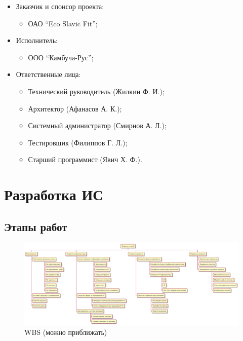 \documentclass[a4paper,8pt]{article}
\begin{document}
    \begin{itemize}
        \item Заказчик и спонсор проекта:
            \begin{itemize}
                \item ОАО “Eco Slavic Fit”;
            \end{itemize}
        \item Исполнитель:
            \begin{itemize}
                \item ООО “Камбуча-Рус”; 
            \end{itemize}
        \item Ответственные лица:
            \begin{itemize}
                \item Технический руководитель (Жилкин Ф. И.);
                \item Архитектор (Афанасов А. К.);
                \item Системный администратор (Смирнов А. Л.);
                \item Тестировщик (Филиппов Г. Л.);
                \item Старший программист (Явич Х. Ф.).
            \end{itemize}
    \end{itemize}

\section{Разработка ИС}



\subsection{Этапы работ}


    \begin{figure}[h]
        \includegraphics[width=\textwidth]{./pics/wbs.pdf}
        \caption {WBS (можно приближать)}
        \centering

    \end{figure}
\end{document}
